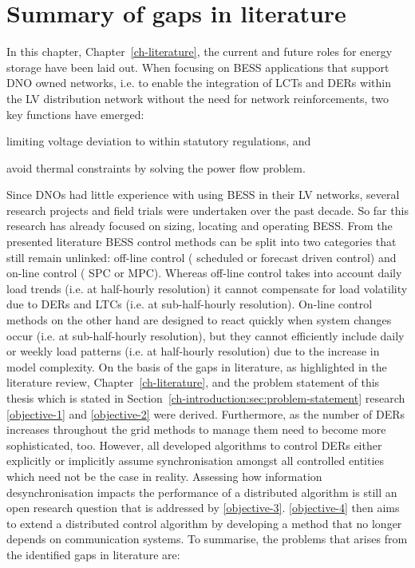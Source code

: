\section{Summary of gaps in literature}
\label{ch-literature:sec:literature-gaps}

In this chapter, Chapter~\ref{ch-literature}, the current and future roles for energy storage have been laid out.
When focusing on BESS applications that support DNO owned networks, i.e. to enable the integration of LCTs and DERs within the LV distribution network without the need for network reinforcements, two key functions have emerged:
\begin{enumerate*}
	\item limiting voltage deviation to within statutory regulations, and
	\item avoid thermal constraints by solving the power flow problem.
\end{enumerate*}
Since DNOs had little experience with using BESS in their LV networks, several research projects and field trials were undertaken over the past decade.
So far this research has already focused on sizing, locating and operating BESS.
From the presented literature BESS control methods can be split into two  categories that still remain unlinked: off-line control ( scheduled or forecast driven control) and on-line control ( SPC or MPC).
Whereas off-line control takes into account daily load trends (i.e. at half-hourly resolution) it cannot compensate for load volatility due to DERs and LTCs (i.e. at sub-half-hourly resolution).
On-line control methods on the other hand are designed to react quickly when system changes occur (i.e. at sub-half-hourly resolution), but they cannot efficiently include daily or weekly load patterns (i.e. at half-hourly resolution) due to the increase in model complexity.
On the basis of the gaps in literature, as highlighted in the literature review, Chapter~\ref{ch-literature}, and the problem statement of this thesis which is stated in Section~\ref{ch-introduction:sec:problem-statement} research \ref{objective-1} and \ref{objective-2} were derived.
Furthermore, as the number of DERs increases throughout the grid methods to manage them need to become more sophisticated, too.
However, all developed algorithms to control DERs either explicitly or implicitly assume synchronisation amongst all controlled entities which need not be the case in reality.
Assessing how information desynchronisation impacts the performance of a distributed algorithm is still an open research question that is addressed by \ref{objective-3}.
\ref{objective-4} then aims to extend a distributed control algorithm by developing a method that no longer depends on communication systems.
To summarise, the problems that arises from the identified gaps in literature are:

